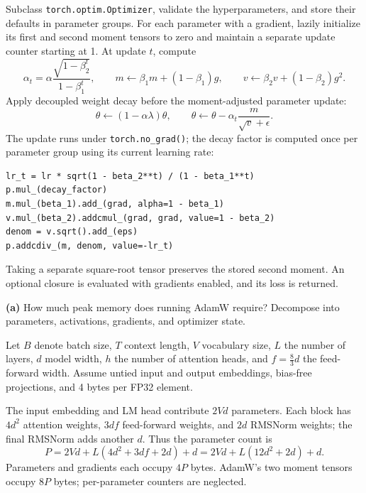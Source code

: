 

Subclass \texttt{torch.optim.Optimizer},
validate the hyperparameters, and store their defaults in parameter groups.
For each parameter with a gradient, lazily initialize its first and second
moment tensors to zero and maintain a separate update counter starting at 1.
At update $t$, compute
\[
\alpha_t=\alpha\frac{\sqrt{1-\beta_2^t}}{1-\beta_1^t},\qquad
m\leftarrow\beta_1m+(1-\beta_1)g,\qquad
v\leftarrow\beta_2v+(1-\beta_2)g^2.
\]
Apply decoupled weight decay before the moment-adjusted parameter update:
\[
\theta\leftarrow(1-\alpha\lambda)\theta,\qquad
\theta\leftarrow\theta-\alpha_t\frac{m}{\sqrt{v}+\epsilon}.
\]
The update runs under \texttt{torch.no\_grad()}; the decay factor is computed
once per parameter group using its current learning rate:
\par\noindent
\begin{minipage}{\linewidth}
\begin{lstlisting}[caption={In-place AdamW update for one parameter}]
lr_t = lr * sqrt(1 - beta_2**t) / (1 - beta_1**t)
p.mul_(decay_factor)
m.mul_(beta_1).add_(grad, alpha=1 - beta_1)
v.mul_(beta_2).addcmul_(grad, grad, value=1 - beta_2)
denom = v.sqrt().add_(eps)
p.addcdiv_(m, denom, value=-lr_t)
\end{lstlisting}
\end{minipage}\par
Taking a separate square-root tensor preserves the stored second moment.
An optional closure is evaluated with gradients enabled, and its loss is
returned.



\textbf{(a)} How much peak memory does running AdamW require? Decompose into parameters, activations, gradients, and optimizer state.


Let $B$ denote batch size, $T$ context length, $V$ vocabulary
size, $L$ the number of layers, $d$ model width, $h$ the number of attention
heads, and $f=\frac83d$ the feed-forward width. Assume untied input and output
embeddings, bias-free projections, and 4 bytes per FP32 element.

The input embedding and LM head contribute $2Vd$ parameters. Each block has
$4d^2$ attention weights, $3df$ feed-forward weights, and $2d$ RMSNorm weights;
the final RMSNorm adds another $d$. Thus the parameter count is
\[
P=2Vd+L(4d^2+3df+2d)+d
 =2Vd+L(12d^2+2d)+d.
\]
Parameters and gradients each occupy $4P$ bytes. AdamW's two moment tensors
occupy $8P$ bytes; per-parameter counters are neglected.

